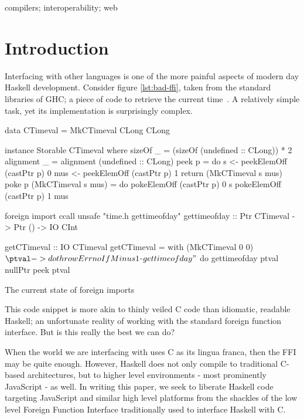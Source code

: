 \documentclass{sigplanconf}
\begin{document}
%
\keywords
compilers; interoperability; web

\section{Introduction}\label{sec:intro}

Interfacing with other languages is one of the more painful aspects of modern
day Haskell development. Consider figure \ref{lst:bad-ffi}, taken from the
standard libraries of GHC; a piece of code to retrieve the
current time\ \cite{time}. A relatively simple task, yet its implementation is
surprisingly complex.

\begin{listingfloat}
\begin{code}
data CTimeval = MkCTimeval CLong CLong

instance Storable CTimeval where
	sizeOf _ = (sizeOf (undefined :: CLong)) * 2
	alignment _ = alignment (undefined :: CLong)
	peek p = do
		s   <- peekElemOff (castPtr p) 0
		mus <- peekElemOff (castPtr p) 1
		return (MkCTimeval s mus)
	poke p (MkCTimeval s mus) = do
		pokeElemOff (castPtr p) 0 s
		pokeElemOff (castPtr p) 1 mus

foreign import ccall unsafe "time.h gettimeofday"
   gettimeofday :: Ptr CTimeval -> Ptr () -> IO CInt

getCTimeval :: IO CTimeval
getCTimeval = with (MkCTimeval 0 0) $ \ptval -> do
  throwErrnoIfMinus1_ "gettimeofday" $ do
    gettimeofday ptval nullPtr
  peek ptval
\end{code}
\caption{The current state of foreign imports}
\label{lst:bad-ffi}
\end{listingfloat}

This code snippet is more akin to thinly veiled C code than idiomatic, readable
Haskell; an unfortunate reality of working with the standard foreign function
interface. But is this really the best we can do?

When the world we are interfacing with uses C as its lingua franca, then the
FFI may be quite enough. However, Haskell does not only compile to
traditional C-based architectures, but to higher level environments - most
prominently JavaScript - as well. In writing this paper, we seek to liberate
Haskell code targeting JavaScript and similar high level platforms from the
shackles of the low level Foreign Function Interface traditionally used to
interface Haskell with C.
\end{document}
